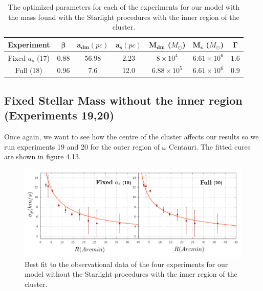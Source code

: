 \begin{table}[H]
\begin{center}
\begin{tabular}{| c| c| c| c| c| c| c|}
    \hline
    \textbf{Experiment} & $\mathbf{\beta}$ & $\mathbf{a_{dm}} (pc)$ & $\mathbf{a_{s}} (pc)$ & $\mathbf{M_{dm}}$ ($M_{\odot}$) & $\mathbf{M_{s}}$ ($M_{\odot}$) & $\mathbf{\Gamma}$\\ \hline
	Fixed $a_s$ (17) &	$0.88$ &	$56.98$ &	$2.23$ &	$8 \times 10^{4}$ &	$6.61 \times 10 ^{6}$ &	$1.6$\\ \hline
	Full (18) &	$0.96$ &	$7.6$ &	$12.0$ &	$6.88 \times 10^{5}$ &	$6.61 \times 10^{6}$ &	$0.9$\\ \hline
  \end{tabular} 
\caption[Optimized parameters for our model with the mass found with the Starlight procedures with the inner region.]{The optimized parameters for each of the experiments for our model with the mass found with the Starlight procedures with the inner region of the cluster.}
\end{center}
\end{table}

\subsection{Fixed Stellar Mass without the inner region (Experiments 19,20)}

Once again, we want to see how the centre of the cluster affects our results so we run experiments 19 and 20 for the outer region of $\omega$ Centauri. The fitted cures are shown in figure 4.13. 

\begin{figure}[H]
\centering
\includegraphics[width=15cm]{images/Starlight_1.png}
\caption[Best fit of our model with the mass found with the Starlight procedures without the inner region]{Best fit to the observational data of the four experiments for our model without the Starlight procedures with the inner region of the cluster.}
\end{figure}

